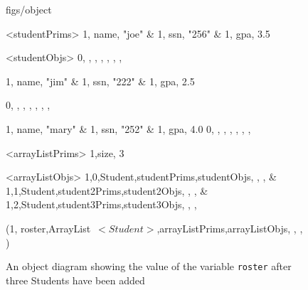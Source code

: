





\begin {figure}


\Draw

 {figs/object}


\Indirect \Table <studentPrims>
{ 1, name, "joe" &
  1, ssn, "256"  &
  1, gpa, 3.5  
}

\Indirect \Table <studentObjs>
{ 0,  ,  ,  ,  , , , }

\Indirect {}
{ 1, name, "jim" &
  1, ssn, "222"  &
  1, gpa, 2.5  
}

\Indirect {}
{ 0,  ,  ,  , , , ,  }

\Indirect {}
{ 1, name, "mary" &
  1, ssn, "252"  &
  1, gpa, 4.0  
} 
\Indirect {}
{ 0,  ,  ,  , , , ,  }

\Indirect \Table <arrayListPrims>
{1,size, 3}


\Indirect \Table <arrayListObjs>
 {  1,0,Student,studentPrims,studentObjs, , ,    &
    1,1,Student,student2Prims,student2Objs, , ,  &
    1,2,Student,student3Prims,student3Objs, , ,  }
  


\Obj (1, roster,ArrayList~$<Student>$,arrayListPrims,arrayListObjs, , , )
    
\EndDraw

\caption {An object diagram showing the value of the
variable \texttt {roster} after three Students have been
added}

\label {fig:ArrayList3}

\end {figure}


